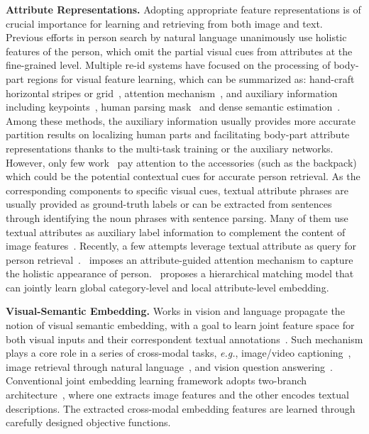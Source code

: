 \documentclass[runningheads]{llncs}
\begin{document}
\noindent\textbf{Attribute Representations.} Adopting appropriate feature representations is of crucial importance for learning and retrieving from both image and text. Previous efforts in person search by natural language unanimously use holistic features of the person, which omit the partial visual cues from attributes at the fine-grained level.
Multiple re-id systems have focused on the processing of body-part regions for visual feature learning, which can be summarized as: hand-craft horizontal stripes or grid~\cite{li2014deepreid,sun2018beyond,wang2018learning}, attention mechanism~\cite{si2018dual,wang2018mancs}, and auxiliary information including keypoints~\cite{xu2018attention,suh2018part}, human parsing mask~\cite{kalayeh2018human,liang2018look} and dense semantic estimation~\cite{zhang2019densely}. Among these methods, the auxiliary information usually provides more accurate partition results on localizing human parts and facilitating body-part attribute representations thanks to the multi-task training or the auxiliary networks. However, only few work~\cite{Guo_2019_ICCV} pay attention to the accessories (such as the backpack) which could be the potential contextual cues for accurate person retrieval.
As the corresponding components to specific visual cues, textual attribute phrases are usually provided as ground-truth labels or can be extracted from sentences through identifying the noun phrases with sentence parsing. Many of them use textual attributes as auxiliary label information to complement the content of image features~\cite{layne2014attributes,su2018multi,lin2019improving}. Recently, a few attempts leverage textual attribute as query for person retrieval~\cite{Dong_2019_ICCV,ijcai2018-153}.~\cite{ijcai2018-153} imposes an
attribute-guided attention mechanism to capture the holistic appearance of person.~\cite{Dong_2019_ICCV} proposes a hierarchical matching model that can jointly learn global category-level and local attribute-level embedding.

\noindent\textbf{Visual-Semantic Embedding.} Works in vision and language propagate the notion of visual semantic embedding, with a goal to learn joint feature space for both visual inputs and their correspondent textual annotations~\cite{frome2013devise,you2018end}. Such mechanism plays a core role in a series of cross-modal tasks, \textit{e.g.}, image/video captioning~\cite{karpathy2015deep,xu2015show,fang2020video2commonsense}, image retrieval through natural language~\cite{zhang2018deep,Wu_2019_CVPR,Fang_2019_CVPR}, and vision question answering~\cite{antol2015vqa}.
Conventional joint embedding learning framework adopts two-branch architecture~\cite{zhang2018deep,frome2013devise,you2018end,Fang_2019_CVPR,fang2018weakly}, where one  extracts image features and the other  encodes textual descriptions. The extracted cross-modal embedding features are learned through carefully designed objective functions.
\end{document}
